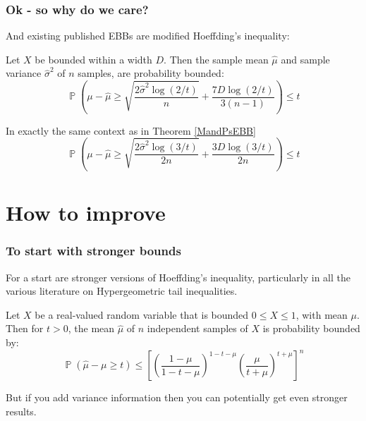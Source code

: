 \documentclass{beamer}
\DeclareMathOperator{\p}{\mathbb{P}}
\begin{document}
\begin{frame}
\frametitle{Ok - so why do we care?}
And existing published EBBs are modified Hoeffding's inequality:
\begin{theorem}\label{MandPsEBB}
Let $X$ be bounded within a width $D$.  Then the sample mean $\hat{\mu}$ and sample variance $\hat{\sigma}^2$ of $n$ samples, are probability bounded:
$$ \p\left(\mu-\hat{\mu}\ge\sqrt{\frac{2\hat{\sigma}^2\log(2/t)}{n}}+\frac{7D\log(2/t)}{3(n-1)}\right)\le t $$
\end{theorem}

\begin{theorem}[\cite{10.1007/978-3-540-75225-7_15}]
In exactly the same context as in Theorem \ref{MandPsEBB}
$$ \p\left(\mu-\hat{\mu}\ge\sqrt{\frac{2\hat{\sigma}^2\log(3/t)}{2n}} + \frac{3D\log(3/t)}{2n}\right) \le t $$
\end{theorem}
\end{frame}



\section{How to improve}

\begin{frame}
\frametitle{To start with stronger bounds}
For a start are stronger versions of Hoeffding's inequality, particularly in all the various literature on Hypergeometric tail inequalities.

\begin{theorem}
Let $X$ be a real-valued random variable that is bounded $0\le X\le 1$, with mean $\mu$. Then for $t>0$, the mean $\hat{\mu}$ of $n$ independent samples of $X$ is probability bounded by:
\begin{equation*}\p(\hat{\mu}-\mu\ge t)\le \left[\left(\frac{1-\mu}{1-t-\mu}\right)^{1-t-\mu}  \left(\frac{\mu}{t+\mu}\right)^{t+\mu}\right]^n
\end{equation*}
\end{theorem}

But if you add variance information then you can potentially get even stronger results.
\end{frame}
\end{document}
